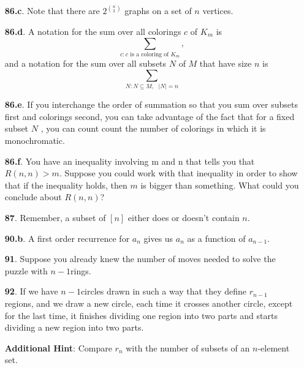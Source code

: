 \documentclass[10pt,]{book}
\theoremstyle{plain}
\theoremstyle{definition}
\theoremstyle{definition}
\numberwithin{equation}{chapter}
\begin{document}
\begin{itemize}[itemsep=1em]
\item[\textbf{86.c}.]\hypertarget{p-526}{}%
Note that there are \(2^{\binom{n}{2}}\) graphs on a set of \(n\) vertices.%

\item[\textbf{86.d}.]\hypertarget{p-529}{}%
A notation for the sum over all colorings \(c\) of \(K_m\) is%
\begin{equation*}
\sum_{c:c\text{ is a coloring of } K_m},
\end{equation*}
and a notation for the sum over all subsets \(N\) of \(M\) that have size \(n\) is%
\begin{equation*}
\sum_{N:N\subseteq M,\text{ }|N|=n}
\end{equation*}
%

\item[\textbf{86.e}.]\hypertarget{p-532}{}%
If you interchange the order of summation so that you sum over subsets first and colorings second, you can take advantage of the fact that for a fixed subset \(N\) , you can count count the number of colorings in which it is monochromatic.%

\item[\textbf{86.f}.]\hypertarget{p-535}{}%
You have an inequality involving m and n that tells you that \(R(n, n) > m\). Suppose you could work with that inequality in order to show that if the inequality holds, then \(m\) is bigger than something. What could you conclude about \(R(n, n)\)?%

\item[\textbf{87}.]\hypertarget{p-540}{}%
Remember, a subset of \([n]\) either does or doesn't contain \(n\).%

\item[\textbf{90.b}.]\hypertarget{p-554}{}%
A first order recurrence for \(a_n\) gives us \(a_n\) as a function of \(a_{n-1}\).%

\item[\textbf{91}.]\hypertarget{p-557}{}%
Suppose you already knew the number of moves needed to solve the puzzle with \(n-1\)rings.%

\item[\textbf{92}.]\hypertarget{p-560}{}%
If we have \(n - 1\)circles drawn in such a way that they define \(r_{n-1}\) regions, and we draw a new circle, each time it crosses another circle, except for the last time, it finishes dividing one region into two parts and starts dividing a new region into two parts.%

\par\smallskip
\noindent\textbf{Additional Hint}: \hypertarget{p-561}{}%
Compare \(r_n\) with the number of subsets of an \(n\)-element set.%


\end{itemize}
\end{document}
